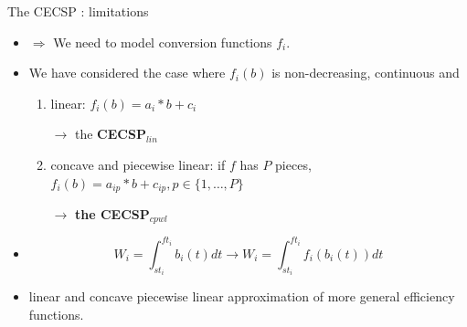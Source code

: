  \begin{frame}{The CECSP : limitations}
   \begin{itemize}
   \item   $\Rightarrow$ We need to model conversion functions $f_i$.
     \vfill
\pause
   \item  We have considered the case where $f_i(b)$ is non-decreasing,
     continuous and  
\pause
     \begin{enumerate}
     \vspace{0.5cm}
     \item linear: $f_i(b)=a_i*b+c_i$ 

     \vspace{0.1cm}
       $\rightarrow$ the {\bf CECSP$_{lin}$}
     \vspace{0.5cm}
\pause
     \item concave and piecewise linear: if $f$ has $P$ pieces,
       $f_i(b)=a_{ip}*b+c_{ip}  , p \in \{1,\dots,P\}$

     \vspace{0.1cm}
       $\rightarrow$ {\bf the CECSP$_{cpwl}$} 
     \end{enumerate}
     \vfill
\pause
   \item   \[W_i=\int_{st_i}^{ft_i}b_i(t)dt \rightarrow W_i=\int_{st_i}^{ft_i}f_i(b_i(t))dt\]
     \vfill
\pause
   \item   linear and concave piecewise linear approximation of more
     general efficiency functions.
 \end{itemize}
   \vfill
 \end{frame}
 
